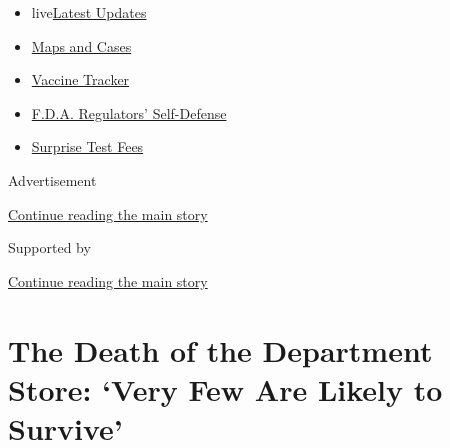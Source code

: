 \begin{itemize}
\tightlist
\item
  live\href{https://www.nytimes3xbfgragh.onion/2020/09/11/world/covid-19-coronavirus.html?name=styln-coronavirus-markets\&region=TOP_BANNER\&block=storyline_menu_recirc\&action=click\&pgtype=Article\&impression_id=9c9471d1-f4ba-11ea-ac49-a90bab9687ed\&variant=undefined}{Latest
  Updates}
\item
  \href{https://www.nytimes3xbfgragh.onion/interactive/2020/us/coronavirus-us-cases.html?name=styln-coronavirus-markets\&region=TOP_BANNER\&block=storyline_menu_recirc\&action=click\&pgtype=Article\&impression_id=9c9471d2-f4ba-11ea-ac49-a90bab9687ed\&variant=undefined}{Maps
  and Cases}
\item
  \href{https://www.nytimes3xbfgragh.onion/interactive/2020/science/coronavirus-vaccine-tracker.html?name=styln-coronavirus-markets\&region=TOP_BANNER\&block=storyline_menu_recirc\&action=click\&pgtype=Article\&impression_id=9c9471d3-f4ba-11ea-ac49-a90bab9687ed\&variant=undefined}{Vaccine
  Tracker}
\item
  \href{https://www.nytimes3xbfgragh.onion/2020/09/10/us/politics/fda-coronavirus-vaccine.html?name=styln-coronavirus-markets\&region=TOP_BANNER\&block=storyline_menu_recirc\&action=click\&pgtype=Article\&impression_id=9c9498e0-f4ba-11ea-ac49-a90bab9687ed\&variant=undefined}{F.D.A.
  Regulators' Self-Defense}
\item
  \href{https://www.nytimes3xbfgragh.onion/2020/09/09/upshot/coronavirus-surprise-test-fees.html?name=styln-coronavirus-markets\&region=TOP_BANNER\&block=storyline_menu_recirc\&action=click\&pgtype=Article\&impression_id=9c9498e1-f4ba-11ea-ac49-a90bab9687ed\&variant=undefined}{Surprise
  Test Fees}
\end{itemize}

Advertisement

\protect\hyperlink{after-top}{Continue reading the main story}

Supported by

\protect\hyperlink{after-sponsor}{Continue reading the main story}

\hypertarget{the-death-of-the-department-store-very-few-are-likely-to-survive}{%
\section{The Death of the Department Store: `Very Few Are Likely to
Survive'}\label{the-death-of-the-department-store-very-few-are-likely-to-survive}}

